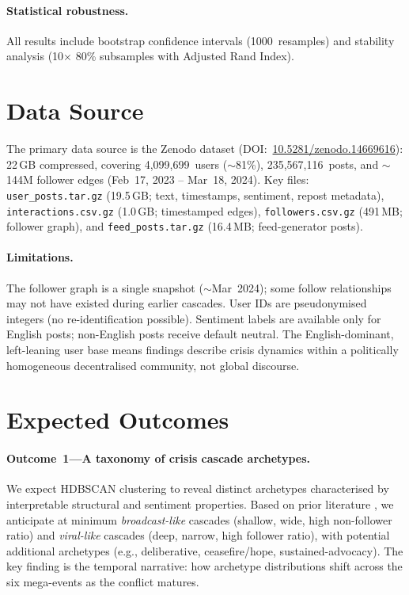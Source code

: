 \documentclass[12pt,a4paper]{article}
\begin{document}
\paragraph{Statistical robustness.}
All results include bootstrap confidence intervals (1000~resamples) and
stability analysis (10$\times$ 80\% subsamples with Adjusted Rand Index).

\section{Data Source}

The primary data source is the \citet{failla2024bluesky} Zenodo dataset
(DOI:~\href{https://doi.org/10.5281/zenodo.14669616}{10.5281/zenodo.14669616}):
22\,GB compressed, covering 4,099,699~users ($\sim$81\%), 235,567,116~posts, and
$\sim$144M follower edges (Feb~17, 2023 -- Mar~18, 2024).  Key files:
\texttt{user\_posts.tar.gz} (19.5\,GB; text, timestamps, sentiment,
repost metadata), \texttt{interactions.csv.gz} (1.0\,GB; timestamped
edges), \texttt{followers.csv.gz} (491\,MB; follower graph), and
\texttt{feed\_posts.tar.gz} (16.4\,MB; feed-generator posts).

\paragraph{Limitations.}
The follower graph is a single snapshot ($\sim$Mar~2024); some follow
relationships may not have existed during earlier cascades.  User IDs are
pseudonymised integers (no re-identification possible).  Sentiment labels are
available only for English posts; non-English posts receive default neutral.
The English-dominant, left-leaning user base
\citep{quelle2025bluesky} means findings describe crisis dynamics within a
politically homogeneous decentralised community, not global discourse.

\section{Expected Outcomes}

\paragraph{Outcome~1---A taxonomy of crisis cascade archetypes.}
We expect HDBSCAN clustering to reveal distinct archetypes characterised by
interpretable structural and sentiment properties.  Based on prior literature
\citep{goel2016structural, vosoughi2018spread}, we anticipate at minimum
\emph{broadcast-like} cascades (shallow, wide, high non-follower ratio) and
\emph{viral-like} cascades (deep, narrow, high follower ratio), with potential
additional archetypes (e.g., deliberative, ceasefire/hope, sustained-advocacy).
The key finding is the temporal narrative: how archetype distributions shift
across the six mega-events as the conflict matures.
\end{document}
